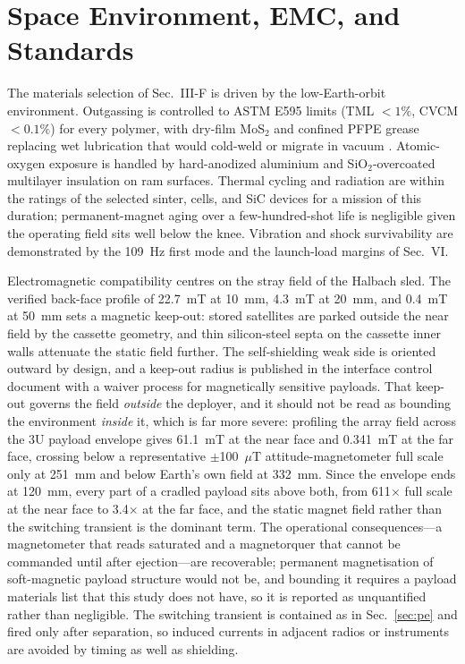 \documentclass[conference]{IEEEtran}
\begin{document}
\section{Space Environment, EMC, and Standards}\label{sec:env}
The materials selection of Sec.~III-F is driven by the low-Earth-orbit environment. Outgassing is controlled to ASTM E595 limits (TML $<1\%$, CVCM $<0.1\%$) for every polymer, with dry-film MoS$_2$ and confined PFPE grease replacing wet lubrication that would cold-weld or migrate in vacuum \cite{ecss}. Atomic-oxygen exposure is handled by hard-anodized aluminium and SiO$_2$-overcoated multilayer insulation on ram surfaces. Thermal cycling and radiation are within the ratings of the selected sinter, cells, and SiC devices for a mission of this duration; permanent-magnet aging over a few-hundred-shot life is negligible given the operating field sits well below the knee. Vibration and shock survivability are demonstrated by the 109~Hz first mode and the launch-load margins of Sec.~VI.

Electromagnetic compatibility centres on the stray field of the Halbach sled. The verified back-face profile of 22.7~mT at 10~mm, 4.3~mT at 20~mm, and 0.4~mT at 50~mm sets a magnetic keep-out: stored satellites are parked outside the near field by the cassette geometry, and thin silicon-steel septa on the cassette inner walls attenuate the static field further. The self-shielding weak side is oriented outward by design, and a keep-out radius is published in the interface control document with a waiver process for magnetically sensitive payloads. That keep-out governs the field \emph{outside} the deployer, and it should not be read as bounding the environment \emph{inside} it, which is far more severe: profiling the array field across the 3U payload envelope gives 61.1~mT at the near face and 0.341~mT at the far face, crossing below a representative $\pm$100~$\mu$T attitude-magnetometer full scale only at 251~mm and below Earth's own field at 332~mm. Since the envelope ends at 120~mm, every part of a cradled payload sits above both, from 611$\times$ full scale at the near face to 3.4$\times$ at the far face, and the static magnet field rather than the switching transient is the dominant term. The operational consequences---a magnetometer that reads saturated and a magnetorquer that cannot be commanded until after ejection---are recoverable; permanent magnetisation of soft-magnetic payload structure would not be, and bounding it requires a payload materials list that this study does not have, so it is reported as unquantified rather than negligible. The switching transient is contained as in Sec.~\ref{sec:pe} and fired only after separation, so induced currents in adjacent radios or instruments are avoided by timing as well as shielding.
\end{document}

